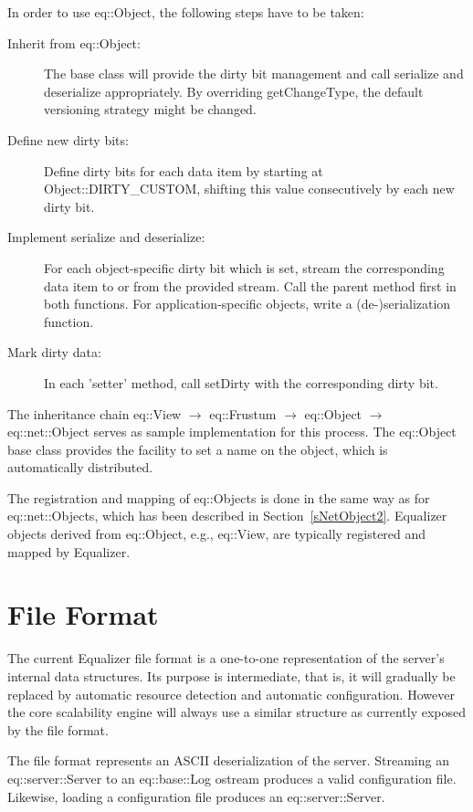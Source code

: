 \documentclass[10pt,a4]{scrartcl}
\newcommand{\sref}[1]{Section~\ref{#1}}
\begin{document}
In order to use \textsf{eq::Object}, the following steps have to be
taken:

\begin{description}
\item[Inherit from \textsf{eq::Object}:] The base class will provide the
  dirty bit management and call serialize and deserialize
  appropriately. By overriding \textsf{getChangeType}, the default
  versioning strategy might be changed.
\item[Define new dirty bits:] Define dirty bits for each data item by
  starting at \textsf{Object::DIRTY\_CUSTOM}, shifting this value
  consecutively by each new dirty bit.
\item[Implement serialize and deserialize:] For each object-specific
  dirty bit which is set, stream the corresponding data item to or from
  the provided stream. Call the parent method first in both
  functions. For application-specific objects, write a (de-)serialization
  function.
\item[Mark dirty data:] In each 'setter' method, call \textsf{setDirty}
  with the corresponding dirty bit.
\end{description}

The inheritance chain \textsf{eq::View} $\rightarrow$
\textsf{eq::Frustum} $\rightarrow$ \textsf{eq::Object} $\rightarrow$
\textsf{eq::net::Object} serves as sample implementation for this
process. The \textsf{eq::Object} base class provides the facility to set
a name on the object, which is automatically distributed.

The registration and mapping of \textsf{eq::Object}s is done in the same
way as for \textsf{eq::net::Object}s, which has been described in
\sref{sNetObject2}. Equalizer objects derived from \textsf{eq::Object},
e.g., \textsf{eq::View}, are typically registered and mapped by
Equalizer.


\newpage
\appendix
\section{\label{aFileFormat}File Format}

The current Equalizer file format is a one-to-one representation of the
server's internal data structures. Its purpose is intermediate, that is,
it will gradually be replaced by automatic resource detection and
automatic configuration. However the core scalability engine will always
use a similar structure as currently exposed by the file format.

The file format represents an ASCII deserialization of the
server. Streaming an \textsf{eq::server::Server} to an \textsf{eq::base::Log}
ostream produces a valid configuration file. Likewise, loading a
configuration file produces an \textsf{eq::server::Server}.
\end{document}
